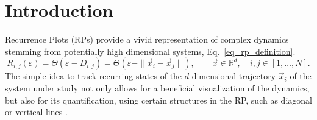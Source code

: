 \documentclass[entropy,article,submit,pdftex,moreauthors]{Definitions/mdpi}
\begin{document}
\section{Introduction}\label{sec_tau_rr_intro}

Recurrence Plots (RPs) provide a vivid representation of complex dynamics stemming from potentially high dimensional systems, Eq.~\eqref{eq_rp_definition}. 
\begin{equation}\label{eq_rp_definition}
R_{i,j}(\varepsilon) = \Theta\left(\varepsilon - D_{i,j}\right) 
= \Theta\left(\varepsilon - \| \vec{x}_i - \vec{x}_j\|\right), \qquad \vec{x} \in \mathbb{R}^d, \quad i,j \in [1,\ldots, N].
\end{equation}
The simple idea to 
track recurring states of the $d$-dimensional trajectory $\vec{x}_i$ of the system under study not only allows for a beneficial visualization of the dynamics, but also for its 
quantification, using certain structures in the RP, such as diagonal or vertical lines \cite{marwan2007}. 
\end{document}
